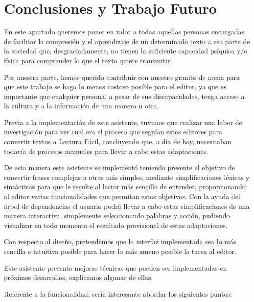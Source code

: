 \chapter{Conclusiones y Trabajo Futuro}
\label{cap:conclusiones}

En este apartado queremos poner en valor a todas aquellas personas encargadas de facilitar la compresión y el aprendizaje de un determinado texto a esa parte de la sociedad que, desgraciadamente, no tienen la suficiente capacidad psíquica y/o física para comprender lo que el texto quiere transmitir.

Por nuestra parte, hemos querido contribuir con nuestro granito de arena para que este trabajo se haga lo menos costoso posible para el editor, ya que es importante que cualquier persona, a pesar de sus discapacidades, tenga acceso a la cultura y a la información de una manera u otra.

Previa a la implementación de este asistente, tuvimos que realizar una labor de investigación para ver cual era el proceso que seguían estos editores para convertir textos a Lectura Fácil, concluyendo que, a día de hoy, necesitaban todavía de procesos manuales para llevar a cabo estas adaptaciones.

De esta manera este asistente se implementó teniendo presente el objetivo de convertir frases complejas a otras más simples, mediante simplificaciones léxicas y sintácticas para que le resulte al lector más sencillo de entender, proporcionando al editor varias funcionalidades que permitan estos objetivos. Con la ayuda del árbol de dependencias el usuario podrá llevar a cabo estas simplificaciones de una manera interactiva, simplemente seleccionando palabras y acción, pudiendo visualizar en todo momento el resultado provisional de estas adaptaciones.


Con respecto al diseño, pretendemos que la interfaz implementada sea lo más sencilla e intuitiva posible para hacer lo más ameno posible la tarea al editor.

Este asistente presenta mejoras técnicas que pueden ser implementadas en próximos desarrollos, explicamos algunas de ellas:

Referente a la funcionalidad, sería interesante abordar los siguientes puntos:

